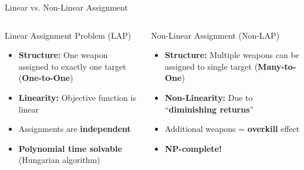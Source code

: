\documentclass[aspectratio=43,8pt]{beamer}
\begin{document}
\begin{frame}{Linear vs. Non-Linear Assignment}
\begin{columns}[t]
\begin{block}{Linear Assignment Problem (LAP)}
\begin{itemize}
    \item \textbf{Structure:} One weapon assigned to exactly one target (\textbf{One-to-One})
    \item \textbf{Linearity:} Objective function is linear
    \item Assignments are \textbf{independent}
    \item \textcolor{accentgreen}{\textbf{Polynomial time solvable}} (Hungarian algorithm)
\end{itemize}
\end{block}

\begin{alertblock}{Non-Linear Assignment (Non-LAP)}
\begin{itemize}
    \item \textbf{Structure:} Multiple weapons can be assigned to single target (\textbf{Many-to-One})
    \item \textbf{Non-Linearity:} Due to ``\textbf{diminishing returns}''
    \item Additional weapons = \textbf{overkill} effect
    \item \textcolor{accentred}{\textbf{NP-complete!}}
\end{itemize}
\end{alertblock}
\end{columns}

\vspace{0.3cm}
\begin{center}
\end{center}
\end{frame}
\end{document}
